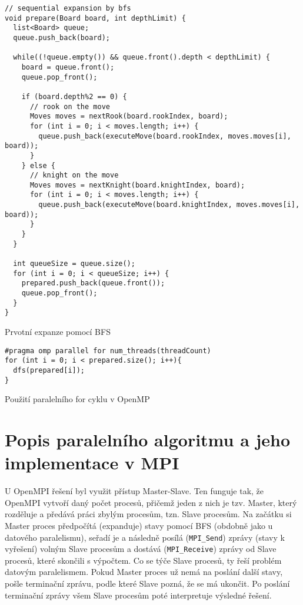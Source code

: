 \documentclass[a4paper,10pt]{article}
\begin{document}
\begin{listing}[H]
\begin{verbatim}
// sequential expansion by bfs
void prepare(Board board, int depthLimit) {
  list<Board> queue;
  queue.push_back(board);

  while((!queue.empty()) && queue.front().depth < depthLimit) {
    board = queue.front();
    queue.pop_front();

    if (board.depth%2 == 0) {
      // rook on the move
      Moves moves = nextRook(board.rookIndex, board);
      for (int i = 0; i < moves.length; i++) {
        queue.push_back(executeMove(board.rookIndex, moves.moves[i], board));
      }
    } else {
      // knight on the move
      Moves moves = nextKnight(board.knightIndex, board);
      for (int i = 0; i < moves.length; i++) {
        queue.push_back(executeMove(board.knightIndex, moves.moves[i], board));
      }
    }
  }

  int queueSize = queue.size();
  for (int i = 0; i < queueSize; i++) {
    prepared.push_back(queue.front());
    queue.pop_front();
  }
}
\end{verbatim}
\caption{Prvotní expanze pomocí BFS}
\end{listing}

\begin{listing}[H]
\begin{verbatim}
#pragma omp parallel for num_threads(threadCount)
for (int i = 0; i < prepared.size(); i++){
  dfs(prepared[i]);
}
\end{verbatim}
\caption{Použití paralelního for cyklu v OpenMP}
\end{listing}


\section{Popis paralelního algoritmu a jeho implementace v MPI}
U OpenMPI řešení byl využit přístup Master-Slave. Ten funguje tak, že OpenMPI vytvoří daný počet procesů, přičemž jeden z nich je tzv. Master, který rozděluje a předává práci zbylým procesům, tzn. Slave procesům. Na začátku si Master proces předpočítá (expanduje) stavy pomocí BFS (obdobně jako u datového paralelismu), seřadí je a následně posílá (\texttt{MPI\_Send}) zprávy (stavy k vyřešení) volným Slave procesům a dostává (\texttt{MPI\_Receive}) zprávy od Slave procesů, které skončili s výpočtem. Co se týče Slave procesů, ty řeší problém datovým paralelismem. Pokud Master proces už nemá na poslání další stavy, pošle terminační zprávu, podle které Slave pozná, že se má ukončit. Po poslání terminační zprávy všem Slave procesům poté interpretuje výsledné řešení.
\end{document}

